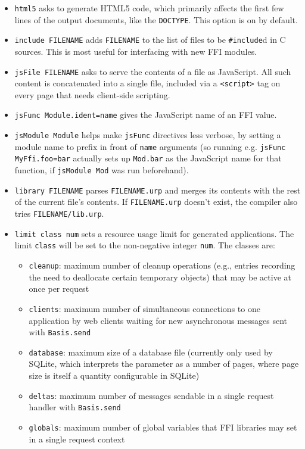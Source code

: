 \documentclass{article}
\begin{document}
\begin{itemize}
\item \texttt{html5} asks to generate HTML5 code, which primarily affects the first few lines of the output documents, like the \texttt{DOCTYPE}.  This option is on by default.
\item \texttt{include FILENAME} adds \texttt{FILENAME} to the list of files to be \texttt{\#include}d in C sources.  This is most useful for interfacing with new FFI modules.
\item \texttt{jsFile FILENAME} asks to serve the contents of a file as JavaScript.  All such content is concatenated into a single file, included via a \texttt{<script>} tag on every page that needs client-side scripting.
\item \texttt{jsFunc Module.ident=name} gives the JavaScript name of an FFI value.
\item \texttt{jsModule Module} helps make \texttt{jsFunc} directives less verbose, by setting a module name to prefix in front of \texttt{name} arguments (so running e.g. \texttt{jsFunc MyFfi.foo=bar} actually sets up \texttt{Mod.bar} as the JavaScript name for that function, if \texttt{jsModule Mod} was run beforehand).
\item \texttt{library FILENAME} parses \texttt{FILENAME.urp} and merges its contents with the rest of the current file's contents.  If \texttt{FILENAME.urp} doesn't exist, the compiler also tries \texttt{FILENAME/lib.urp}.
\item \texttt{limit class num} sets a resource usage limit for generated applications.  The limit \texttt{class} will be set to the non-negative integer \texttt{num}.  The classes are:
  \begin{itemize}
  \item \texttt{cleanup}: maximum number of cleanup operations (e.g., entries recording the need to deallocate certain temporary objects) that may be active at once per request
  \item \texttt{clients}: maximum number of simultaneous connections to one application by web clients waiting for new asynchronous messages sent with \texttt{Basis.send}
  \item \texttt{database}: maximum size of a database file (currently only used by SQLite, which interprets the parameter as a number of pages, where page size is itself a quantity configurable in SQLite)
  \item \texttt{deltas}: maximum number of messages sendable in a single request handler with \texttt{Basis.send}
  \item \texttt{globals}: maximum number of global variables that FFI libraries may set in a single request context

\end{itemize}
\end{itemize}
\end{document}
